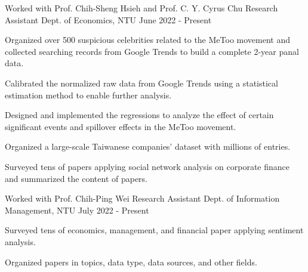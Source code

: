 

\begin{cventries}

  \cventry
    {Worked with Prof. Chih-Sheng Hsieh and Prof. C. Y. Cyrus Chu} %
    {Research Assistant} %
    {Dept. of Economics, NTU} %
    {June 2022 - Present} %
    {
        \begin{cvitems}
        \item {Organized over 500 suspicious celebrities 
            related to the MeToo movement
            and collected searching records from Google Trends 
            to build a complete 2-year panal data.}
        \item {Calibrated the normalized raw data from Google Trends
            using a statistical estimation method
            to enable further analysis.}
        \item {Designed and implemented the regressions 
            to analyze the effect of certain significant events and 
            spillover effects in the MeToo movement.}
        \item {Organized a large-scale Taiwanese companies' dataset
            with millions of entries.}
        \item {Surveyed tens of papers applying
            social network analysis on corporate finance
            and summarized the content of papers.}
        \end{cvitems}
    }

    \cventry
    {Worked with Prof. Chih-Ping Wei} %
    {Research Assistant} %
    {Dept. of Information Management, NTU} %
    {July 2022 - Present} %
    {
        \begin{cvitems}
        \item Surveyed tens of economics, management,
            and financial paper applying sentiment analysis.
        \item Organized papers in topics, data type,
            data sources, and other fields.
        \end{cvitems}
    }


\end{cventries}
